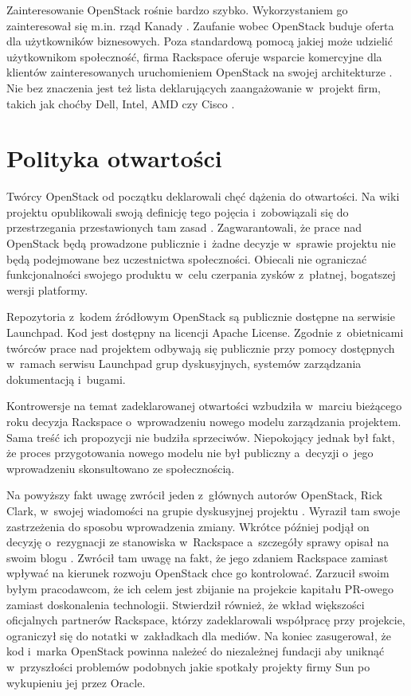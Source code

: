 \documentclass[a4paper,12pt]{article}
\begin{document}
	Zainteresowanie OpenStack rośnie bardzo szybko. Wykorzystaniem go
	zainteresował się m.in. rząd Kanady \cite{computerworld_bort}. Zaufanie
	wobec OpenStack buduje oferta dla użytkowników biznesowych. Poza
	standardową pomocą jakiej może udzielić użytkownikom społeczność, firma
	Rackspace oferuje wsparcie komercyjne dla klientów zainteresowanych
	uruchomieniem OpenStack na swojej architekturze
	\cite{openstack_goes_commercial}. Nie bez znaczenia jest też lista
	deklarujących zaangażowanie w~projekt firm, takich jak choćby Dell, Intel,
	AMD czy Cisco \cite{openstack}.

	\section{Polityka otwartości}

	Twórcy OpenStack od początku deklarowali chęć dążenia do otwartości. Na wiki
	projektu opublikowali swoją definicję tego pojęcia i~zobowiązali się do
	przestrzegania przestawionych tam zasad \cite{openness}. Zagwarantowali, że
	prace nad OpenStack będą prowadzone publicznie i~żadne decyzje w~sprawie
	projektu nie będą podejmowane bez uczestnictwa społeczności. Obiecali
	nie ograniczać funkcjonalności swojego produktu w~celu czerpania zysków
	z~płatnej, bogatszej wersji platformy.

	Repozytoria z~kodem źródłowym OpenStack są publicznie dostępne na serwisie
	Launchpad. Kod jest dostępny na licencji Apache License. Zgodnie
	z~obietnicami twórców prace nad projektem odbywają się publicznie przy
	pomocy dostępnych w~ramach serwisu Launchpad grup dyskusyjnych, systemów
	zarządzania dokumentacją i~bugami.

	Kontrowersje na temat zadeklarowanej otwartości wzbudziła w~marciu bieżącego
	roku decyzja Rackspace o~wprowadzeniu nowego modelu zarządzania projektem.
	Sama treść ich propozycji nie budziła sprzeciwów. Niepokojący jednak był
	fakt, że proces przygotowania nowego modelu nie był publiczny a~decyzji
	o~jego wprowadzeniu skonsultowano ze społecznością.

	Na powyższy fakt uwagę zwrócił jeden z~głównych autorów OpenStack, Rick
	Clark, w~swojej wiadomości na grupie dyskusyjnej projektu
	\cite{clark_list_msg}. Wyraził tam swoje zastrzeżenia do sposobu
	wprowadzenia zmiany. Wkrótce później podjął on decyzję o~rezygnacji ze
	stanowiska w~Rackspace a~szczegóły sprawy opisał na swoim blogu
	\cite{why_i_left_rackspace}. Zwrócił tam uwagę na fakt, że jego zdaniem
	Rackspace zamiast wpływać na kierunek rozwoju OpenStack chce go kontrolować.
	Zarzucił swoim byłym pracodawcom, że ich celem jest zbijanie na projekcie
	kapitału PR-owego zamiast doskonalenia technologii. Stwierdził również, że
	wkład większości oficjalnych partnerów Rackspace, którzy zadeklarowali
	współpracę przy projekcie, ograniczył się do notatki w~zakładkach dla
	mediów. Na koniec zasugerował, że kod i~marka OpenStack powinna należeć do
	niezależnej fundacji aby uniknąć w~przyszłości problemów podobnych jakie
	spotkały projekty firmy Sun po wykupieniu jej przez Oracle.

	
	
\end{document}
